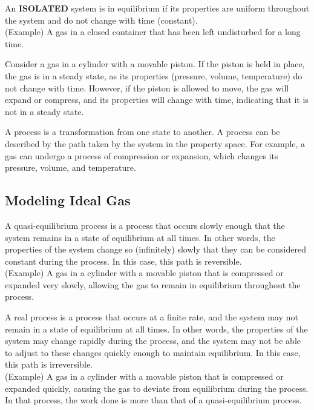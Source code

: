 \documentclass[11pt]{report}
\begin{document}
\begin{definition}[Equilibrium]
    An \textbf{ISOLATED} system is in equilibrium if its properties are uniform throughout the system and do not change with time (constant). \\
    (Example) A gas in a closed container that has been left undisturbed for a long time.
\end{definition}
\begin{example}
    Consider a gas in a cylinder with a movable piston. If the piston is held in place, the gas is in a steady state, as its properties (pressure, volume, temperature) do not change with time. However, if the piston is allowed to move, the gas will expand or compress, and its properties will change with time, indicating that it is not in a steady state. 
\end{example}
\begin{definition}[Process]
    A process is a transformation from one state to another. A process can be described by the path taken by the system in the property space. For example, a gas can undergo a process of compression or expansion, which changes its pressure, volume, and temperature.
\end{definition}

\subsection{Modeling Ideal Gas}
\begin{definition}
    A quasi-equilibrium process is a process that occurs slowly enough that the system remains in a state of equilibrium at all times. In other words, the properties of the system change so (infinitely) slowly that they can be considered constant during the process. In this case, this path is reversible. \\
    (Example) A gas in a cylinder with a movable piston that is compressed or expanded very slowly, allowing the gas to remain in equilibrium throughout the process.
\end{definition}

\begin{definition}
    A real process is a process that occurs at a finite rate, and the system may not remain in a state of equilibrium at all times. In other words, the properties of the system may change rapidly during the process, and the system may not be able to adjust to these changes quickly enough to maintain equilibrium. In this case, this path is irreversible. \\
    (Example) A gas in a cylinder with a movable piston that is compressed or expanded quickly, causing the gas to deviate from equilibrium during the process. In that process, the work done is more than that of a quasi-equilibrium process.
\end{definition}
\end{document}
